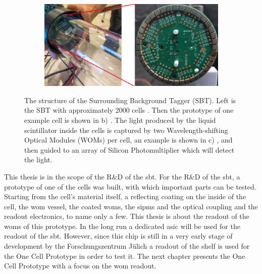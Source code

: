 \begin{figure}
\begin{subfigure}[b]{0.24\textwidth}
		\caption{}
		\label{fig:sbt_structure_cell}
	\end{subfigure}
	\begin{subfigure}[b]{0.42\textwidth}
		\centering
		\includegraphics[width=1.\textwidth]{pictures/sbt_structure_wom}
		\caption{}
		\label{fig:sbt_structure}
	\end{subfigure}
	\caption[Overview of the Surrounding Background Tagger]{The structure of the Surrounding Background Tagger (SBT). Left is the SBT with approximately 2000 cells \cite{}. Then the prototype of one example cell is shown in b) \cite{}. The light produced by the liquid scintillator inside the cells is captured by two Wavelength-shifting Optical Modules (WOMs) per cell, an example is shown in c) \cite{}, and then guided to an array of Silicon Photomultiplier which will detect the light.}
 	\label{fig:sbt}
\end{figure}

This thesis is in the scope of the R\&D of the \ac{sbt}.
For the R\&D of the \ac{sbt}, a prototype of one of the cells was built, with which important parts can be tested.
Starting from the cell's material itself, a reflecting coating on the inside of the cell, the \ac{wom} vessel, the coated \acp{wom}, the \acp{sipm} and the optical coupling and the readout electronics, to name only a few.
This thesis is about the readout of the \acp{wom} of this prototype.
In the long run a dedicated \ac{asic} will be used for the readout of the \ac{sbt}.
However, since this chip is still in a very early stage of development by the Forschungszentrum Jülich a readout of the shelf is used for the One Cell Prototype in order to test it.
The next chapter presents the One Cell Prototype with a focus on the \ac{wom} readout.
